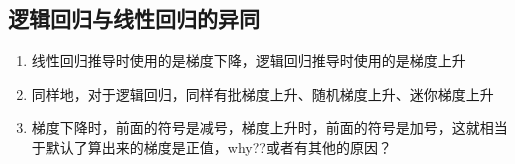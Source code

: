 \begin{enumerate}
\begin{enumerate}
\begin{enumerate}
		\end{enumerate}
	\end{enumerate}

\end{enumerate}



\subsection{逻辑回归与线性回归的异同}
\begin{enumerate}
	\item 线性回归推导时使用的是梯度下降，逻辑回归推导时使用的是梯度上升
	\item 同样地，对于逻辑回归，同样有批梯度上升、随机梯度上升、迷你梯度上升
	\item 梯度下降时，前面的符号是减号，梯度上升时，前面的符号是加号，这就相当于默认了算出来的梯度是正值，why??或者有其他的原因？
\end{enumerate}






















